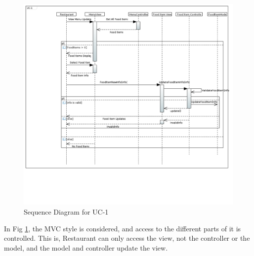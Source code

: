 \begin{figure}[h!]
\begin{center}
\includegraphics[scale=0.35]{FIGS/UC-11.PNG}
    \caption{Sequence Diagram for UC-1}
    \label{fig:seq_diag1}
\end{center}
\end{figure}

In Fig \ref{fig:seq_diag1}, the MVC style is considered, and access to the different parts of it is controlled. This is, Restaurant can only access the view, not the controller or the model, and the model and controller update the view.

